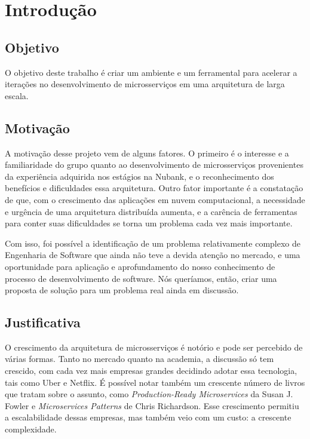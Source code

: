 \chapter{Introdução}
	\section{Objetivo}
	O objetivo deste trabalho é criar um ambiente e um ferramental para acelerar a iterações no desenvolvimento de microsserviços em uma arquitetura de larga escala.
	\section{Motivação}
	A motivação desse projeto vem de alguns fatores. O primeiro é o interesse e a familiaridade do grupo quanto ao desenvolvimento de microsserviços provenientes da experiência adquirida nos estágios na Nubank, e o reconhecimento dos benefícios e dificuldades essa arquitetura. Outro fator importante é a constatação de que, com o crescimento das aplicações em nuvem computacional, a necessidade e urgência de uma arquitetura distribuída aumenta, e a carência de ferramentas para conter suas dificuldades se torna um problema cada vez mais importante.
	
	Com isso, foi possível a identificação de um problema relativamente complexo de Engenharia de Software que ainda não teve a devida atenção no mercado, e uma oportunidade para aplicação e aprofundamento do nosso conhecimento de processo de desenvolvimento de software. Nós queríamos, então, criar uma proposta de solução para um problema real ainda em discussão.
	\section{Justificativa}
	O crescimento da arquitetura de microsserviços é notório e pode ser percebido de várias formas. Tanto no mercado quanto na academia, a discussão só tem crescido, com cada vez mais empresas grandes decidindo adotar essa tecnologia, tais como Uber e Netflix. É possível notar também um crescente número de livros que tratam sobre o assunto, como \textit{Production-Ready Microservices} da Susan J. Fowler\cite{productionreadyms} e \textit{Microservices Patterns} de Chris Richardson\cite{mspatterns}. Esse crescimento permitiu a escalabilidade dessas empresas, mas também veio com um custo: a crescente complexidade.
	
